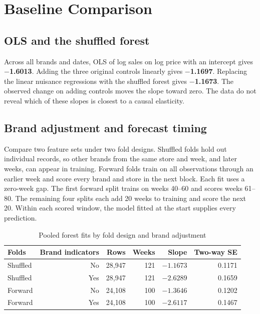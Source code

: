 \section{Baseline Comparison}\label{sec:baseline_comparison}

\subsection{OLS and the shuffled forest}

Across all brands and dates, OLS of log sales on log price with an intercept gives \textbf{\ensuremath{-}1.6013}. Adding the three original controls linearly gives \textbf{\ensuremath{-}1.1697}. Replacing the linear nuisance regressions with the shuffled forest gives \textbf{\ensuremath{-}1.1673}. The observed change on adding controls moves the slope toward zero. The data do not reveal which of these slopes is closest to a causal elasticity.

\subsection{Brand adjustment and forecast timing}

Compare two feature sets under two fold designs. Shuffled folds hold out individual records, so other brands from the same store and week, and later weeks, can appear in training. Forward folds train on all observations through an earlier week and score every brand and store in the next block. Each fit uses a zero-week gap. The first forward split trains on weeks 40--60 and scores weeks 61--80. The remaining four splits each add 20 weeks to training and score the next 20. Within each scored window, the model fitted at the start supplies every prediction.

\begin{table}[htbp]
\centering
\caption{Pooled forest fits by fold design and brand adjustment}
\label{tab:estimator_comparison}
\small
\setlength{\tabcolsep}{3pt}
\begin{tabular}{@{}lrrrrr@{}}
\toprule
Folds & Brand indicators & Rows & Weeks & Slope & Two-way SE \\
\midrule
Shuffled & No & 28,947 & 121 & $-1.1673$ & 0.1171 \\
Shuffled & Yes & 28,947 & 121 & $-2.6289$ & 0.1659 \\
Forward & No & 24,108 & 100 & $-1.3646$ & 0.1202 \\
Forward & Yes & 24,108 & 100 & $-2.6117$ & 0.1467 \\
\bottomrule
\end{tabular}
\end{table}

